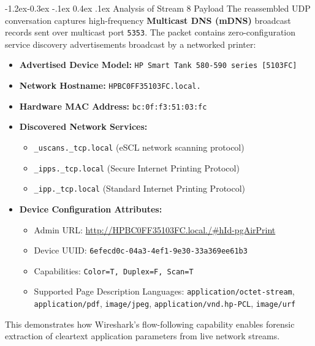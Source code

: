 \documentclass[11pt,a4paper]{article}
\makeatletter
\renewcommand\subsubsection{\@startsection{subsubsection}{3}{\z@}%
  {-1.2ex\@plus -0.3ex \@minus -.1ex}%
  {0.4ex \@plus .1ex}%
  {\normalfont\normalsize\bfseries}}
\makeatother
\begin{document}
\subsubsection{Analysis of Stream 8 Payload}
The reassembled UDP conversation captures high-frequency \textbf{Multicast DNS (mDNS)} broadcast records sent over multicast port \texttt{5353}. The packet contains zero-configuration service discovery advertisements broadcast by a networked printer:
\begin{itemize}
  \item \textbf{Advertised Device Model:} \texttt{HP Smart Tank 580-590 series [5103FC]}
  \item \textbf{Network Hostname:} \texttt{HPBC0FF35103FC.local.}
  \item \textbf{Hardware MAC Address:} \texttt{bc:0f:f3:51:03:fc}
  \item \textbf{Discovered Network Services:}
  \begin{itemize}
    \item \texttt{\_uscans.\_tcp.local} (eSCL network scanning protocol)
    \item \texttt{\_ipps.\_tcp.local} (Secure Internet Printing Protocol)
    \item \texttt{\_ipp.\_tcp.local} (Standard Internet Printing Protocol)
  \end{itemize}
  \item \textbf{Device Configuration Attributes:}
  \begin{itemize}
    \item Admin URL: \url{http://HPBC0FF35103FC.local./#hId-pgAirPrint}
    \item Device UUID: \texttt{6efecd0c-04a3-4ef1-9e30-33a369ee61b3}
    \item Capabilities: \texttt{Color=T, Duplex=F, Scan=T}
    \item Supported Page Description Languages: \texttt{application/octet-stream}, \texttt{application/pdf}, \texttt{image/jpeg}, \texttt{application/vnd.hp-PCL}, \texttt{image/urf}
  \end{itemize}
\end{itemize}
This demonstrates how Wireshark's flow-following capability enables forensic extraction of cleartext application parameters from live network streams.

\end{document}
